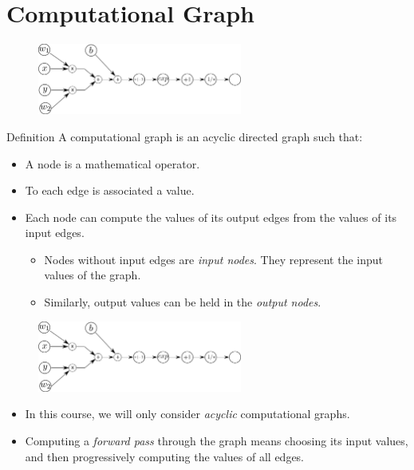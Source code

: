 \documentclass{book}
\begin{document}
\section{Computational Graph}

\begin{figure}[h]
    \centering
    \includegraphics[width=0.6\textwidth]{comp_graph2}
\end{figure}

\begin{myblock}{Definition}
A computational graph is an acyclic directed graph such that:
\begin{itemize}
\item A node is a mathematical operator.
\item To each edge is associated a value.
\item Each node can compute the values of its output edges from the values of its input edges.
    \begin{itemize}
    \item Nodes without input edges are \emph{input nodes}. They represent the input values of the graph.
    \item Similarly, output values can be held in the \emph{output nodes}.
    \end{itemize}
\end{itemize}
\end{myblock}

\begin{figure}[h]
    \centering
    \includegraphics[width=0.6\textwidth]{comp_graph2}
\end{figure}

\begin{itemize}
\item In this course, we will only consider \emph{acyclic} computational graphs.
\item Computing a \emph{forward pass} through the graph means choosing its input values, and then progressively computing the values of all edges.
\end{itemize}
\end{document}
